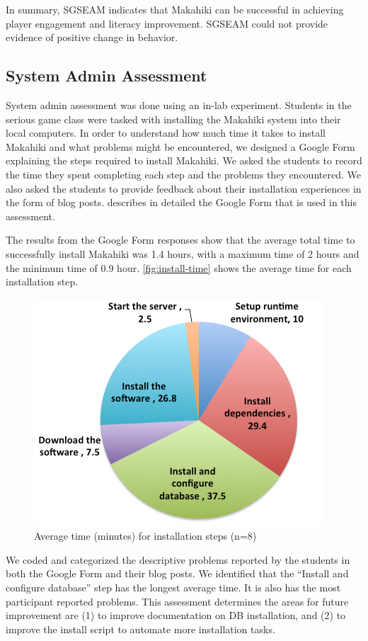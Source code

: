 \documentclass{sigchi}
\begin{document}
In summary, SGSEAM indicates that Makahiki can be successful in achieving
player engagement and literacy improvement. SGSEAM could not provide evidence of positive change in
behavior.

\subsection{System Admin Assessment}

System admin assessment was done using an in-lab experiment.  Students in
the serious game class were tasked with installing the Makahiki system into their local
computers. In order to understand how much time it takes to install Makahiki and what
problems might be encountered, we designed a Google Form explaining the steps required to
install Makahiki. We asked the students to record the time they spent completing each step
and the problems they encountered. We also asked the students to provide feedback about
their installation experiences in the form of blog posts. \cite{csdl2-13-04} describes in detailed
the Google Form that is used in this assessment.

The results from the Google Form responses show that the average total time to successfully install
Makahiki was 1.4 hours, with a maximum time of 2 hours and the minimum time of 0.9 hour.
\autoref{fig:install-time} shows the average time for each installation step.

\begin{figure}
  \center
  \includegraphics[width=0.6\columnwidth]{install-time}
  \caption{Average time (minutes) for installation steps (n=8)}
  \label{fig:install-time}
\end{figure}

We coded and categorized the descriptive problems reported by the students in both the Google Form
and their blog posts. We identified that the ``Install and configure database'' step has the
longest average time. It is also has the most participant reported problems. This assessment determines the areas for future
improvement are (1) to improve documentation on DB installation, and (2) to improve the install script to automate
more installation tasks.
\end{document}
